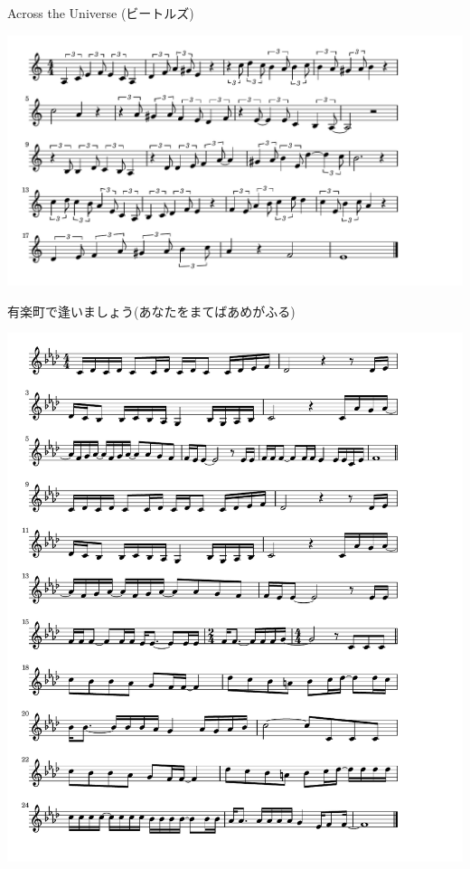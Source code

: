 \documentclass[a4paper]{ltjsarticle}
\begin{document}
\vspace{-10mm} \hspace{10mm}
Across the Universe (ビートルズ)

\includegraphics[clip]{yurakucho_crop.pdf}

\vspace{-10mm} \hspace{10mm}
有楽町で逢いましょう(あなたをまてばあめがふる)

\includegraphics[clip]{cosmos_crop.pdf}
\end{document}
